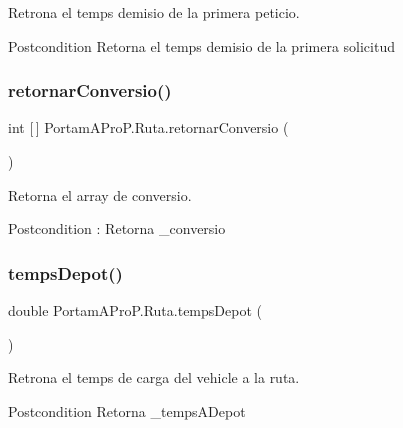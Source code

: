 Retrona el temps d\textquotesingle{}emisio de la primera peticio. 

\begin{DoxyPostcond}{Postcondition}
Retorna el temps d\textquotesingle{}emisio de la primera solicitud 
\end{DoxyPostcond}
\mbox{\label{class_portam_a_pro_p_1_1_ruta_ab6ab0fe415c2a1925e21c495d350d798}} 
\subsubsection{\texorpdfstring{retornar\+Conversio()}{retornarConversio()}}
{\footnotesize\ttfamily int \mbox{[}$\,$\mbox{]} Portam\+A\+Pro\+P.\+Ruta.\+retornar\+Conversio (\begin{DoxyParamCaption}{ }\end{DoxyParamCaption})}



Retorna el array de conversio. 

\begin{DoxyPostcond}{Postcondition}
\+: Retorna \+\_\+conversio 
\end{DoxyPostcond}
\mbox{\label{class_portam_a_pro_p_1_1_ruta_ae5415a9448cd8cb22835016e95718a0c}} 
\subsubsection{\texorpdfstring{temps\+Depot()}{tempsDepot()}}
{\footnotesize\ttfamily double Portam\+A\+Pro\+P.\+Ruta.\+temps\+Depot (\begin{DoxyParamCaption}{ }\end{DoxyParamCaption})}



Retrona el temps de carga del vehicle a la ruta. 

\begin{DoxyPostcond}{Postcondition}
Retorna \+\_\+temps\+A\+Depot 
\end{DoxyPostcond}
\mbox{\label{class_portam_a_pro_p_1_1_ruta_a6cfb254ff066e62ac3373ae5e7eb28ba}} 
